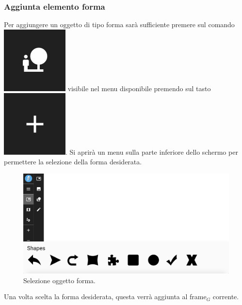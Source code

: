 \subsubsection{Aggiunta elemento forma}
Per aggiungere un oggetto di tipo forma sarà sufficiente premere sul comando \includegraphics[scale=0.4]{img/add_shape.png} visibile nel menu disponibile premendo sul tasto \includegraphics[scale=0.4]{img/add_object.png}. Si aprirà un menu sulla parte inferiore dello schermo per permettere la selezione della forma desiderata.\\
\begin{figure}[h]
\begin{center}
\includegraphics[scale=0.35]{img/sel_shape.png}
\caption{Selezione oggetto forma.}
\end{center}
\end{figure}

Una volta scelta la forma desiderata, questa verrà aggiunta al frame$_G$ corrente.

